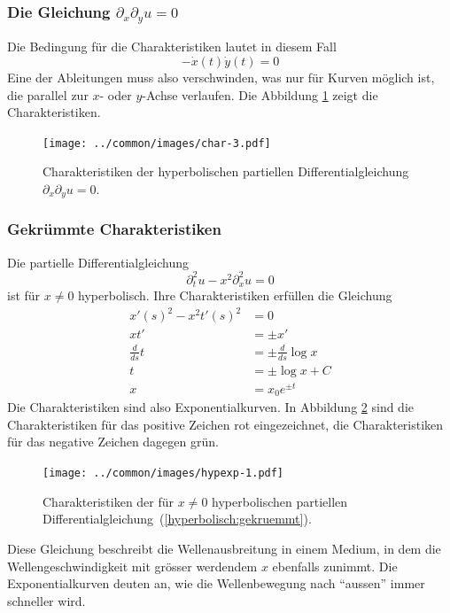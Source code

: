 \subsubsection{Die Gleichung $\partial_x\partial_yu=0$} Die Bedingung für die
Charakteristiken lautet in diesem Fall
\[
-\dot x(t)\dot y(t)=0
\]
Eine der Ableitungen muss also verschwinden, was nur für Kurven
möglich ist, die parallel zur $x$- oder $y$-Achse verlaufen.
Die Abbildung \ref{hyp:dxdy} zeigt die Charakteristiken.
\begin{figure}
\begin{center}
\texttt{[image: ../common/images/char-3.pdf]}
\end{center}
\caption{Charakteristiken der hyperbolischen
partiellen Differentialgleichung
$\partial_x\partial_yu=0$.
\label{hyp:dxdy}}
\end{figure}

\subsubsection{Gekrümmte Charakteristiken}
Die partielle Differentialgleichung
\begin{equation}
\partial_t^2u-x^2\partial_x^2u=0
\label{hyperbolisch:gekruemmt}
\end{equation}
ist für $x\ne 0$ hyperbolisch.
Ihre Charakteristiken erfüllen die Gleichung
\begin{align*}
x'(s)^2-x^2t'(s)^2&=0
\\
xt'&=\pm  x'
\\
\frac{d}{ds}t&=\pm\frac{d}{ds}\log x
\\
t&=\pm\log x+C
\\
x&=x_0e^{\pm t}
\end{align*}
Die Charakteristiken sind also Exponentialkurven. In Abbildung \ref{hyp:exp}
sind die Charakteristiken für das positive Zeichen rot eingezeichnet, die
Charakteristiken für das negative Zeichen dagegen grün.
\begin{figure}
\begin{center}
\texttt{[image: ../common/images/hypexp-1.pdf]}
\end{center}
\caption{Charakteristiken der für $x\ne 0$ hyperbolischen
partiellen Differentialgleichung~(\ref{hyperbolisch:gekruemmt}).
\label{hyp:exp}}
\end{figure}

Diese Gleichung beschreibt die Wellenausbreitung in einem Medium,
in dem die Wellengeschwindigkeit mit grösser werdendem $x$ ebenfalls
zunimmt. Die Exponentialkurven deuten an, wie die Wellenbewegung nach ``aussen''
immer schneller wird.

